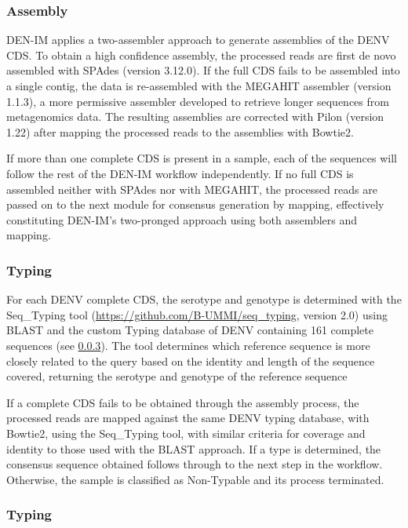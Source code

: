 \subsubsection{Assembly}

DEN-IM applies a two-assembler approach to generate assemblies of the DENV CDS. To obtain a high confidence assembly, the processed reads are first de novo assembled with SPAdes \citep{bankevich_spades_2012} (version 3.12.0). If the full CDS fails to be assembled into a single contig, the data is re-assembled with the MEGAHIT assembler \citep{li_megahit_2015} (version 1.1.3), a more permissive assembler developed to retrieve longer sequences from metagenomics data. The resulting assemblies are corrected with Pilon \citep{walker_pilon_2014} (version 1.22) after mapping the processed reads to the assemblies with Bowtie2.

If more than one complete CDS is present in a sample, each of the sequences will follow the rest of the DEN-IM workflow independently. If no full CDS is assembled neither with SPAdes nor with MEGAHIT, the processed reads are passed on to the next module for consensus generation by mapping, effectively constituting DEN-IM’s two-pronged approach using both assemblers and mapping.

\subsubsection{Typing}

For each DENV complete CDS, the serotype and genotype is determined with the Seq\_Typing tool (\url{https://github.com/B-UMMI/seq\_typing}, version 2.0) \citep{machado_epidemiological_2017} using BLAST \citep{altschul_gapped_1997} and the custom Typing database of DENV containing 161 complete sequences (see \ref{}). The tool determines which reference sequence is more closely related to the query based on the identity and length of the sequence covered, returning the serotype and genotype of the reference sequence

If a complete CDS fails to be obtained through the assembly process, the processed reads are mapped against the same DENV typing database, with Bowtie2, using the Seq\_Typing tool, with similar criteria for coverage and identity to those used with the BLAST approach. If a type is determined, the consensus sequence obtained follows through to the next step in the workflow. Otherwise, the sample is classified as Non-Typable and its process terminated.

\subsubsection{Typing}

